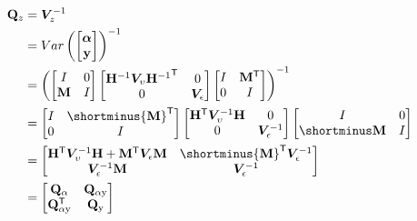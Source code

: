 \documentclass[notitlepage,a4paper,12pt]{article}
\newcommand{\transpose}[1]{{#1}^{\sf{T}}}
\begin{document}
\begin{align*}
    \mathbf{Q}_z 
    &= 
    \bm{V}^{-1}_z \\
    &= 
    Var\left(
    \begin{bmatrix}
        \boldsymbol{\alpha} \\
        \mathbf{y}
    \end{bmatrix}
    \right)^{-1} \\
    &=  
    \left(
    \begin{bmatrix}
        I & 0 \\
        \mathbf{M} & I
    \end{bmatrix}
    \begin{bmatrix}
        \mathbf{H}^{-1} \bm{V}_{\upsilon} \transpose{\mathbf{H}^{-1}} & 0 \\
        0 & \bm{V}_{\epsilon}
    \end{bmatrix} 
    \begin{bmatrix}
        I & \transpose{\mathbf{M}} \\
        0 & I
    \end{bmatrix}
    \right)^{-1}\\
    &=
    \begin{bmatrix}
        I & \shortminus\transpose{\mathbf{M}} \\
        0 & I
    \end{bmatrix}
    \begin{bmatrix}
        \transpose{\mathbf{H}} \bm{V}^{-1}_{\upsilon} \mathbf{H} & 0 \\
        0 & \bm{V}^{-1}_{\epsilon}
    \end{bmatrix} 
    \begin{bmatrix}
        I & 0 \\
        \shortminus\mathbf{M} & I 
    \end{bmatrix} \\
    &=
    \begin{bmatrix}
         \transpose{\mathbf{H}} \bm{V}^{-1}_{\upsilon} \mathbf{H} + \transpose{\mathbf{M}}\bm{V}_{\epsilon}\mathbf{M}  & \shortminus \transpose{\mathbf{M}} \bm{V}^{-1}_{\epsilon} \\
         \bm{V}^{-1}_{\epsilon} \mathbf{M} & \bm{V}^{-1}_{\epsilon}
    \end{bmatrix} \\
    &= 
    \begin{bmatrix}
        \mathbf{Q}_{\alpha} & \mathbf{Q}_{\alpha\text{y}} \\
        \transpose{\mathbf{Q}}_{\alpha \text{y}} & \mathbf{Q}_{\text{y}}  
    \end{bmatrix}
\end{align*}
\end{document}
